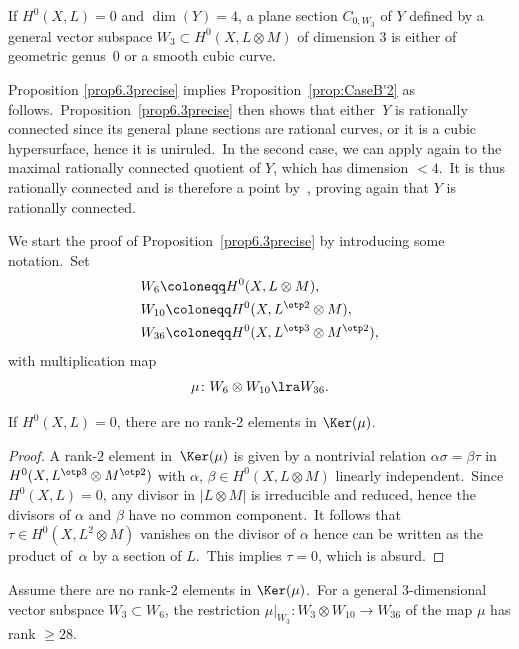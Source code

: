 \begin{prop}
\notready\label{prop6.3precise} If   $H^0(X,L)=0$ and $\dim (Y)=4$, a plane section $C_{0,W_3}$ of $Y$ defined by a general vector subspace $W_3\subset H^0(X,L\otimes M)$ of dimension $3$   is either  of geometric genus~$0$ or  a smooth cubic curve.
\end{prop}

Proposition \ref{prop6.3precise} implies Proposition~\ref{prop:CaseB'2} as follows.\  Proposition~\ref{prop6.3precise} then  shows that either~$Y$ is  rationally connected since  its general plane sections are rational curves, or it is  a cubic hypersurface, hence it is uniruled.\ In the second case, we can   apply \cite[Theorem~1.4]{linthese} again to the maximal rationally connected quotient of $Y$, which has dimension $<4$.\ It is thus rationally connected and is therefore a point by~\cite{GHS}, proving again that $Y$ is rationally connected.

We   start the proof of Proposition~\ref{prop6.3precise} by introducing some notation.\
Set
\begin{align*}
&W_6\coloneqq H^0(X,L\otimes M),\\
&W_{10}\coloneqq H^0(X,L^{\otp 2}\otimes M),\\
&W_{36}\coloneqq H^0(X,L^{\otp 3}\otimes  M^{\otp 2}),
\end{align*}
with multiplication map
\[
\mu\colon W_6\otimes W_{10}\lra W_{36}.
\]

\begin{lemm}\label{lem:NoRk2}
If $H^0(X,L)=0$,  there are no rank-2 elements in $\Ker(\mu)$.
\end{lemm}

\begin{proof}
A rank-$2$ element in~$\Ker(\mu)$ is given by a nontrivial relation
$\alpha\sigma=\beta \tau $ in $H^0(X,L^{\otp 3}\otimes M^{\otp 2})$ with $\alpha,\,\beta\in H^0(X,L\otimes M)$ linearly independent.\ Since $H^0(X,L)=0$, any divisor in $|L\otimes M|$ is irreducible and reduced, hence the divisors of $\alpha$ and $\beta$  have no common component.\ It follows that $\tau\in H^0(X,L^2\otimes M)$ vanishes on the divisor of $\alpha$ hence can be written as the product of~$\alpha$ by a section of $L$.\ This implies $\tau=0$, which is absurd.
\end{proof}

\begin{lemm}\label{leW6W10}
Assume there are no rank-$2$ elements in $\Ker(\mu)$.\
For a general $3$-dimensional vector subspace $W_3\subset W_6$, the restriction $\mu\vert_{W_3}\colon W_3\otimes W_{10}\to W_{36}$ of the map $\mu$ has rank $\geq 28$.
\end{lemm}

